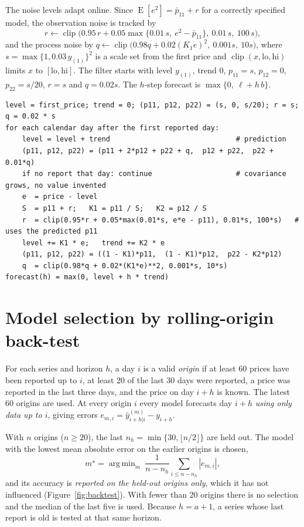 \documentclass[12pt,a4paper,oneside]{report}
\numberwithin{equation}{chapter}
\numberwithin{figure}{chapter}
\numberwithin{table}{chapter}
\theoremstyle{definition}
\DeclareMathOperator{\E}{E}
\DeclareMathOperator{\argmin}{arg\,min}
\newcommand{\hatt}[1]{\widehat{#1}}
\begin{document}
The noise levels adapt online. Since $\E[e^2]=\bar p_{11}+r$ for a correctly specified model, the observation noise is tracked by
\begin{equation}
  r\leftarrow\operatorname{clip}\bigl(0.95\,r+0.05\max\{0.01\,s,\ e^2-\bar p_{11}\},\ 0.01\,s,\ 100\,s\bigr),
  \label{eq:r}
\end{equation}
and the process noise by $q\leftarrow\operatorname{clip}\bigl(0.98q+0.02(K_1e)^2,\ 0.001s,\ 10s\bigr)$, where $s=\max\{1,0.03\,y_{(1)}\}^2$ is a scale set from the first price and $\operatorname{clip}(x,\text{lo},\text{hi})$ limits $x$ to $[\text{lo},\text{hi}]$. The filter starts with level $y_{(1)}$, trend 0, $p_{11}=s$, $p_{12}=0$, $p_{22}=s/20$, $r=s$ and $q=0.02s$. The $h$-step forecast is $\max\{0,\ \ell+h\,b\}$.

\begin{lstlisting}[caption={Adaptive Kalman recursion on a daily grid with gaps (simplified)}]
level = first_price; trend = 0; (p11, p12, p22) = (s, 0, s/20); r = s; q = 0.02 * s
for each calendar day after the first reported day:
    level = level + trend                              # prediction
    (p11, p12, p22) = (p11 + 2*p12 + p22 + q,  p12 + p22,  p22 + 0.01*q)
    if no report that day: continue                    # covariance grows, no value invented
    e  = price - level
    S  = p11 + r;   K1 = p11 / S;   K2 = p12 / S
    r  = clip(0.95*r + 0.05*max(0.01*s, e*e - p11), 0.01*s, 100*s)   # uses the predicted p11
    level += K1 * e;   trend += K2 * e
    (p11, p12, p22) = ((1 - K1)*p11,  (1 - K1)*p12,  p22 - K2*p12)
    q  = clip(0.98*q + 0.02*(K1*e)**2, 0.001*s, 10*s)
forecast(h) = max(0, level + h * trend)
\end{lstlisting}

\section{Model selection by rolling-origin back-test}
For each series and horizon $h$, a day $i$ is a valid \emph{origin} if at least 60 prices have been reported up to $i$, at least 20 of the last 30 days were reported, a price was reported in the last three days, and the price on day $i+h$ is known. The latest 60 origins are used. At every origin $i$ every model forecasts day $i+h$ \emph{using only data up to $i$}, giving errors $e_{m,i}=\hatt{y}^{(m)}_{i+h|i}-y_{i+h}$.

With $n$ origins ($n\ge 20$), the last $n_h=\min\{30,\lfloor n/2\rfloor\}$ are held out. The model with the lowest mean absolute error on the earlier origins is chosen,
\begin{equation}
  m^\star=\argmin_{m}\ \frac{1}{n-n_h}\sum_{i\le n-n_h}|e_{m,i}|,
  \label{eq:select}
\end{equation}
and its accuracy is \emph{reported on the held-out origins only}, which it has not influenced (Figure~\ref{fig:backtest}). With fewer than 20 origins there is no selection and the median of the last five is used. Because $h=a+1$, a series whose last report is old is tested at that same horizon.
\end{document}

